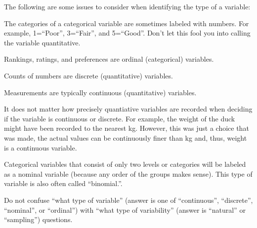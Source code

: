\documentclass[10pt,openany]{book}\usepackage[]{graphicx}\usepackage[]{color}
\begin{document}
The following are some issues to consider when identifying the type of a variable:
\begin{Enumerate}
  \item The categories of a categorical variable are sometimes labeled with numbers. For example, 1=``Poor'', 3=``Fair'', and 5=``Good''.  Don't let this fool you into calling the variable quantitative.
  \item Rankings, ratings, and preferences are ordinal (categorical) variables.
  \item Counts of numbers are discrete (quantitative) variables.
  \item Measurements are typically continuous (quantitative) variables.
  \item It does not matter how precisely quantiative variables are recorded when deciding if the variable is continuous or discrete. For example, the weight of the duck might have been recorded to the nearest kg. However, this was just a choice that was made, the actual values can be continuously finer than kg and, thus, weight is a continuous variable.
  \item Categorical variables that consist of only two levels or categories will be labeled as a nominal variable (because any order of the groups makes sense).  This type of variable is also often called ``binomial.''.
  \item Do not confuse ``what type of variable'' (answer is one of ``continuous'', ``discrete'', ``nominal'', or ``ordinal'')  with ``what type of variability'' (answer is ``natural'' or ``sampling'') questions.
\end{Enumerate}


\vspace{-12pt}
\end{document}
